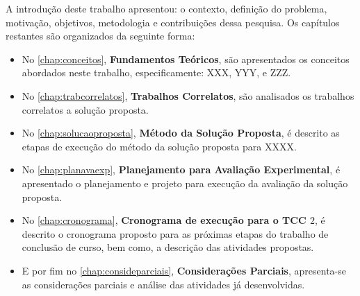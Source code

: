 A introdução deste trabalho apresentou: o contexto, definição do problema, motivação, objetivos, metodologia e contribuições dessa pesquisa. Os capítulos restantes são organizados da seguinte forma:
\begin{itemize}
    \item No \autoref{chap:conceitos}, \textbf{Fundamentos Teóricos}, são apresentados os conceitos abordados neste trabalho, especificamente: XXX, YYY, e ZZZ.
    \item No \autoref{chap:trabcorrelatos}, \textbf{Trabalhos Correlatos}, são analisados os trabalhos correlatos a solução proposta.
    \item No \autoref{chap:solucaoproposta}, \textbf{Método da Solução Proposta}, é descrito as etapas de execução do método da solução proposta para XXXX.
    \item No \autoref{chap:planavaexp}, \textbf{Planejamento para Avaliação Experimental}, é apresentado o planejamento e projeto para execução da avaliação da solução proposta.
    \item No \autoref{chap:cronograma}, \textbf{Cronograma de execução para o TCC $2$}, é descrito o cronograma proposto para as próximas etapas do trabalho de conclusão de curso, bem como, a descrição das atividades propostas.
    \item E por fim no \autoref{chap:consideparciais}, \textbf{Considerações Parciais}, apresenta-se as considerações parciais e análise das atividades já desenvolvidas.
\end{itemize}{}


